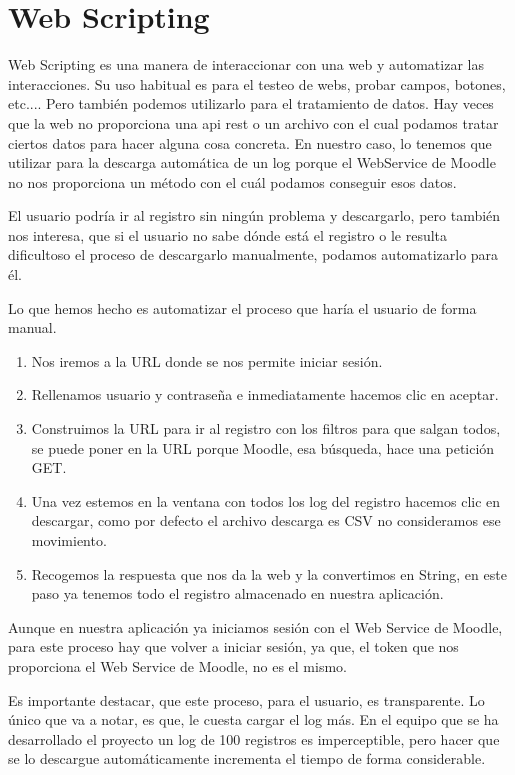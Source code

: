 \section{Web Scripting}\label{web-scripting}

Web Scripting es una manera de interaccionar con una web y automatizar las interacciones. Su uso habitual es para  el testeo de webs, probar campos, botones, etc.... Pero también podemos utilizarlo para el tratamiento de datos. Hay veces que la web no proporciona una api rest o un archivo con el cual podamos tratar ciertos datos para hacer alguna cosa concreta. En nuestro caso, lo tenemos que utilizar para la descarga automática de un log porque el WebService de Moodle no nos proporciona un método con el cuál podamos conseguir esos datos.

El usuario podría ir al registro sin ningún problema y descargarlo, pero también nos interesa, que si el usuario no sabe dónde está el registro o le resulta dificultoso el proceso de descargarlo manualmente, podamos automatizarlo para él.
 
Lo que hemos hecho es automatizar el proceso que haría el usuario de forma manual. 
 \begin{enumerate}
 	\item 
 	Nos iremos a la URL donde se nos permite iniciar sesión.
 	\item 
 	Rellenamos usuario y contraseña e inmediatamente hacemos clic en aceptar.
 	\item 
 	Construimos la URL para ir al registro con los filtros para que salgan todos, se puede poner en la URL porque Moodle, esa búsqueda, hace una petición GET.
 	\item 
 	Una vez estemos en la ventana con todos los log del registro hacemos clic en descargar, como por defecto el archivo descarga es CSV no consideramos ese movimiento.
 	\item 
 	Recogemos la respuesta que nos da la web y la convertimos en String, en este paso ya tenemos todo el registro almacenado en nuestra aplicación.
 \end{enumerate}
 
Aunque en nuestra aplicación ya iniciamos sesión con el Web Service de Moodle, para este proceso hay que volver a iniciar sesión, ya que, el token que nos proporciona el Web Service de Moodle, no es el mismo.

Es importante destacar, que este proceso, para el usuario, es transparente. Lo único que va a notar, es que, le cuesta cargar el log más. En el equipo que se ha desarrollado el proyecto un log de 100 registros es imperceptible, pero hacer que se lo descargue automáticamente incrementa el tiempo de forma considerable.
 